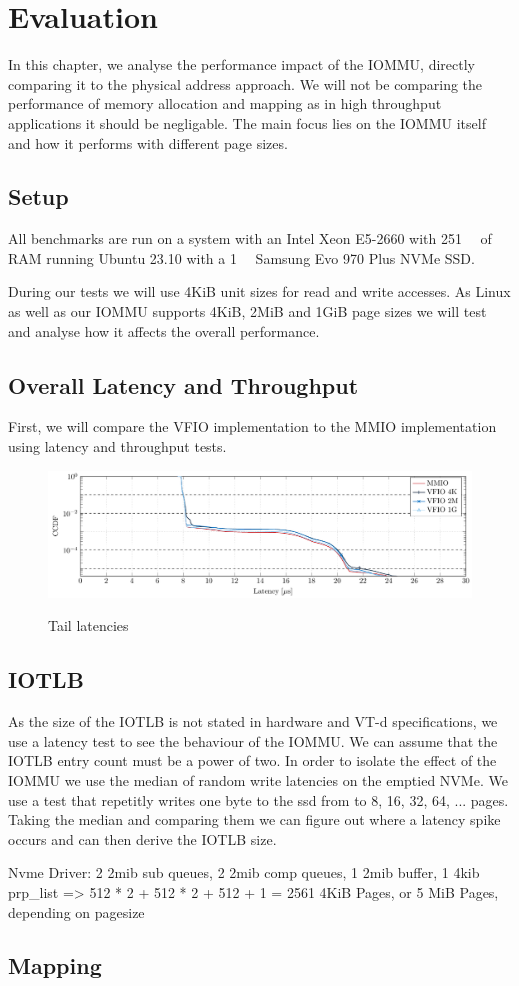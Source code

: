 \chapter{Evaluation}
In this chapter, we analyse the performance impact of the IOMMU, directly comparing it to the physical address approach. We will not be comparing the performance of memory allocation and mapping as in high throughput applications it should be negligable. The main focus lies on the IOMMU itself and how it performs with different page sizes.

\section{Setup}
All benchmarks are run on a system with an Intel Xeon E5-2660 with \qty{251}{\gibi\byte} of RAM running Ubuntu 23.10 with a \qty{1}{\tera\byte} Samsung Evo 970 Plus NVMe SSD.

During our tests we will use 4KiB unit sizes for read and write accesses.
As Linux as well as our IOMMU supports 4KiB, 2MiB and 1GiB page sizes we will test and analyse how it affects the overall performance.

\section{Overall Latency and Throughput}
First, we will compare the VFIO implementation to the MMIO implementation using latency and throughput tests.
\begin{figure}
    \centering
     {\includegraphics[width=\textwidth]{figures/latency_write} \label{fig:ccdf-write}}
    \caption{Tail latencies}
    \label{fig:ccdf}
\end{figure}

\section{IOTLB}
As the size of the IOTLB is not stated in hardware and VT-d specifications, we use a latency test to see the behaviour of the IOMMU. We can assume that the IOTLB entry count must be a power of two. In order to isolate the effect of the IOMMU we use the median of random write latencies on the emptied NVMe. We use a test that repetitly writes one byte to the ssd from to 8, 16, 32, 64, ... pages. Taking the median and comparing them we can figure out where a latency spike occurs and can then derive the IOTLB size.

Nvme Driver: 2 2mib sub queues, 2 2mib comp queues, 1 2mib buffer, 1 4kib prp\_list => 512 * 2 + 512 * 2 + 512 + 1 = 2561 4KiB Pages, or 5 MiB Pages, depending on pagesize

\section{Mapping}